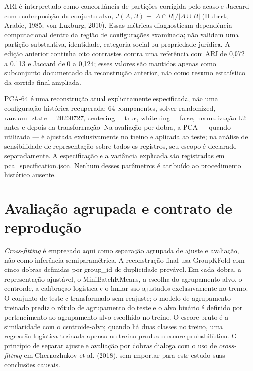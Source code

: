 ARI é interpretado como concordância de partições corrigida pelo acaso e Jaccard como sobreposição do conjunto-alvo, $J(A,B)=\lvert A\cap B\rvert/\lvert A\cup B\rvert$ (Hubert; Arabie, 1985; von Luxburg, 2010). Essas métricas diagnosticam dependência computacional dentro da região de configurações examinada; não validam uma partição substantiva, identidade, categoria social ou propriedade jurídica. A edição anterior continha oito contrastes contra uma referência com ARI de 0,072 a 0,113 e Jaccard de 0 a 0,124; esses valores são mantidos apenas como subconjunto documentado da reconstrução anterior, não como resumo estatístico da corrida final ampliada.

PCA-64 é uma reconstrução atual explicitamente especificada, não uma configuração histórica recuperada: 64 componentes, solver randomized, random\_state = 20260727, centering = true, whitening = false, normalização L2 antes e depois da transformação. Na avaliação por dobra, a PCA --- quando utilizada --- é ajustada exclusivamente no treino e aplicada ao teste; na análise de sensibilidade de representação sobre todos os registros, seu escopo é declarado separadamente. A especificação e a variância explicada são registradas em pca\_specification.json. Nenhum desses parâmetros é atribuído ao procedimento histórico ausente.

\section{Avaliação agrupada e contrato de reprodução}

\emph{Cross-fitting} é empregado aqui como separação agrupada de ajuste e avaliação, não como inferência semiparamétrica. A reconstrução final usa GroupKFold com cinco dobras definidas por group\_id de duplicidade provável. Em cada dobra, a representação ajustável, o MiniBatchKMeans, a escolha do agrupamento-alvo, o centroide, a calibração logística e o limiar são ajustados exclusivamente no treino. O conjunto de teste é transformado sem reajuste; o modelo de agrupamento treinado prediz o rótulo de agrupamento do teste e o alvo binário é definido por pertencimento ao agrupamento-alvo escolhido no treino. O escore bruto é a similaridade com o centroide-alvo; quando há duas classes no treino, uma regressão logística treinada apenas no treino produz o escore probabilístico. O princípio de separar ajuste e avaliação por dobras dialoga com o uso de \emph{cross-fitting} em Chernozhukov et al. (2018), sem importar para este estudo suas conclusões causais.

